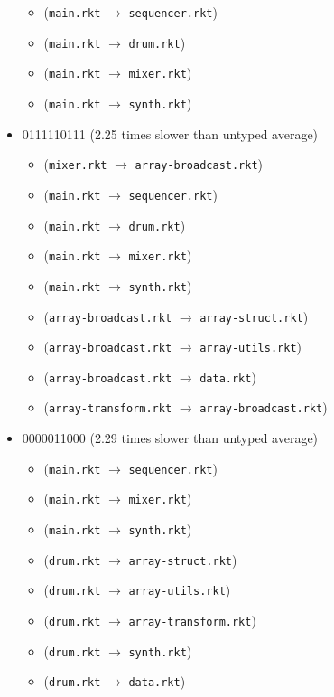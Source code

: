 \documentclass{article}
\newcommand{\mono}[1]{\texttt{#1}}
\begin{document}
\begin{itemize}
  \begin{itemize}
  \item (\mono{main.rkt} $\rightarrow$ \mono{sequencer.rkt})
  \item (\mono{main.rkt} $\rightarrow$ \mono{drum.rkt})
  \item (\mono{main.rkt} $\rightarrow$ \mono{mixer.rkt})
  \item (\mono{main.rkt} $\rightarrow$ \mono{synth.rkt})
  \end{itemize}
\item 0111110111 (2.25 times slower than untyped average)
  \begin{itemize}
  \item (\mono{mixer.rkt} $\rightarrow$ \mono{array-broadcast.rkt})
  \item (\mono{main.rkt} $\rightarrow$ \mono{sequencer.rkt})
  \item (\mono{main.rkt} $\rightarrow$ \mono{drum.rkt})
  \item (\mono{main.rkt} $\rightarrow$ \mono{mixer.rkt})
  \item (\mono{main.rkt} $\rightarrow$ \mono{synth.rkt})
  \item (\mono{array-broadcast.rkt} $\rightarrow$ \mono{array-struct.rkt})
  \item (\mono{array-broadcast.rkt} $\rightarrow$ \mono{array-utils.rkt})
  \item (\mono{array-broadcast.rkt} $\rightarrow$ \mono{data.rkt})
  \item (\mono{array-transform.rkt} $\rightarrow$ \mono{array-broadcast.rkt})
  \end{itemize}
\item 0000011000 (2.29 times slower than untyped average)
  \begin{itemize}
  \item (\mono{main.rkt} $\rightarrow$ \mono{sequencer.rkt})
  \item (\mono{main.rkt} $\rightarrow$ \mono{mixer.rkt})
  \item (\mono{main.rkt} $\rightarrow$ \mono{synth.rkt})
  \item (\mono{drum.rkt} $\rightarrow$ \mono{array-struct.rkt})
  \item (\mono{drum.rkt} $\rightarrow$ \mono{array-utils.rkt})
  \item (\mono{drum.rkt} $\rightarrow$ \mono{array-transform.rkt})
  \item (\mono{drum.rkt} $\rightarrow$ \mono{synth.rkt})
  \item (\mono{drum.rkt} $\rightarrow$ \mono{data.rkt})

\end{itemize}
\end{itemize}
\end{document}
